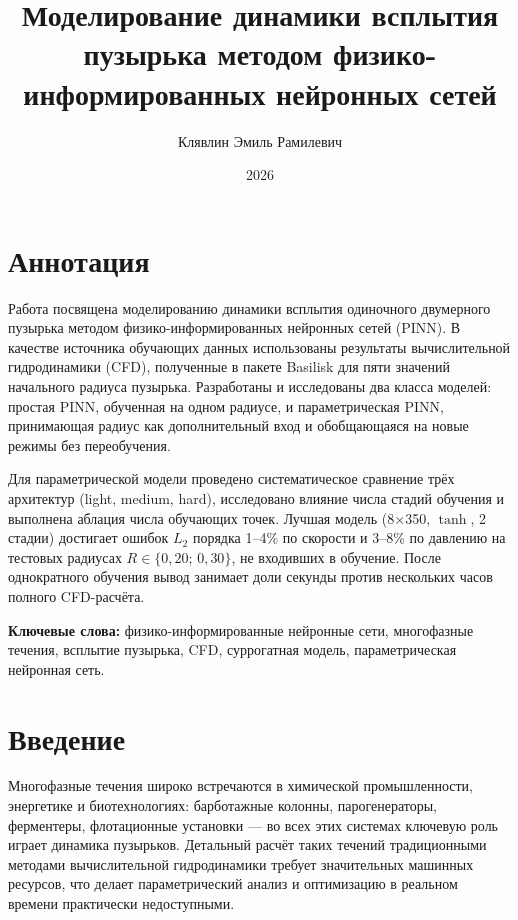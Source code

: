 \documentclass[12pt,a4paper]{article}
\title{Моделирование динамики всплытия пузырька методом физико-информированных нейронных сетей}
\author{Клявлин Эмиль Рамилевич}
\date{2026}
\begin{document}
\maketitle

\newpage
\tableofcontents
\newpage

\section*{Аннотация}

Работа посвящена моделированию динамики всплытия одиночного двумерного пузырька
методом физико-информированных нейронных сетей (PINN). В качестве источника
обучающих данных использованы результаты вычислительной гидродинамики (CFD),
полученные в пакете Basilisk для пяти значений начального радиуса пузырька.
Разработаны и исследованы два класса моделей: простая PINN, обученная на одном
радиусе, и параметрическая PINN, принимающая радиус как дополнительный вход и
обобщающаяся на новые режимы без переобучения.

Для параметрической модели проведено систематическое сравнение трёх архитектур
(light, medium, hard), исследовано влияние числа стадий обучения и выполнена
аблация числа обучающих точек. Лучшая модель (8$\times$350, $\tanh$, 2 стадии)
достигает ошибок $L_2$ порядка 1--4\% по скорости и 3--8\% по давлению на
тестовых радиусах $R\in\{0{,}20;\,0{,}30\}$, не входивших в обучение.
После однократного обучения вывод занимает доли секунды против нескольких часов
полного CFD-расчёта.

\bigskip
\noindent\textbf{Ключевые слова:} физико-информированные нейронные сети,
многофазные течения, всплытие пузырька, CFD, суррогатная модель,
параметрическая нейронная сеть.

\newpage

\section*{Введение}


Многофазные течения широко встречаются в химической промышленности, энергетике
и биотехнологиях: барботажные колонны, парогенераторы, ферментеры, флотационные
установки --- во всех этих системах ключевую роль играет динамика пузырьков.
Детальный расчёт таких течений традиционными методами вычислительной
гидродинамики требует значительных машинных ресурсов, что делает
параметрический анализ и оптимизацию в реальном времени практически недоступными.
\end{document}
